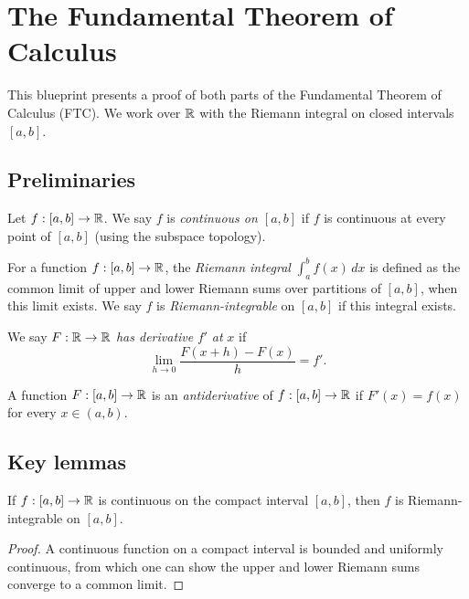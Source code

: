 \chapter{The Fundamental Theorem of Calculus}

This blueprint presents a proof of both parts of the Fundamental Theorem of Calculus (FTC).
We work over $\mathbb{R}$ with the Riemann integral on closed intervals $[a,b]$.

\section{Preliminaries}

\begin{definition}
  \label{def:continuous_on}
  \uses{}
  Let $f : [a,b] \to \mathbb{R}$. We say $f$ is \emph{continuous on $[a,b]$} if $f$ is continuous
  at every point of $[a,b]$ (using the subspace topology).
\end{definition}

\begin{definition}
  \label{def:interval_integral}
  \uses{}
  For a function $f : [a,b] \to \mathbb{R}$, the \emph{Riemann integral}
  $\int_a^b f(x)\,dx$ is defined as the common limit of upper and lower Riemann sums
  over partitions of $[a,b]$, when this limit exists. We say $f$ is
  \emph{Riemann-integrable} on $[a,b]$ if this integral exists.
\end{definition}

\begin{definition}
  \label{def:has_deriv_at}
  \uses{}
  We say $F : \mathbb{R} \to \mathbb{R}$ \emph{has derivative} $f'$ \emph{at} $x$ if
  \[
    \lim_{h \to 0} \frac{F(x+h) - F(x)}{h} = f'.
  \]
\end{definition}

\begin{definition}[Antiderivative]
  \label{def:antiderivative}
  A function $F : [a,b] \to \mathbb{R}$ is an \emph{antiderivative} of $f : [a,b] \to \mathbb{R}$ if
  $F'(x) = f(x)$ for every $x \in (a,b)$.
\end{definition}

\section{Key lemmas}

\begin{lemma}
  \label{lem:continuous_integrable}
  If $f : [a,b] \to \mathbb{R}$ is continuous on the compact interval $[a,b]$, then $f$ is
  Riemann-integrable on $[a,b]$.
\end{lemma}
\begin{proof}
  A continuous function on a compact interval is bounded and uniformly continuous,
  from which one can show the upper and lower Riemann sums converge to a common limit.
\end{proof}


